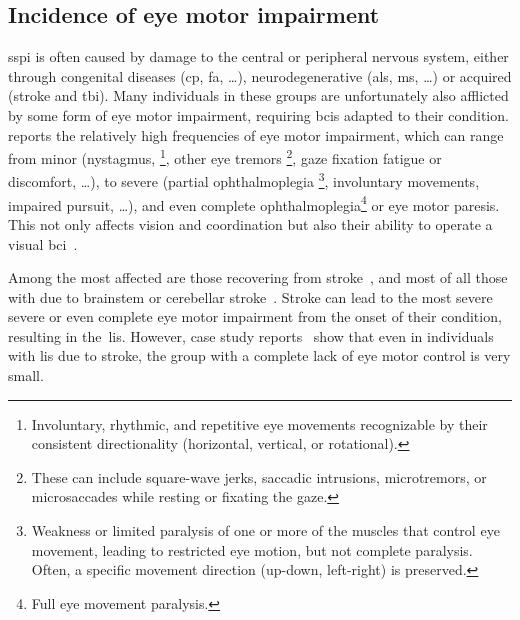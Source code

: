 \subsection{Incidence of eye motor impairment}
\label{sec:gaze-independent/gaze-dependence/incidence}
\Ac{sspi} is often caused by damage to the central or peripheral nervous
system, either through congenital diseases (\ac{cp}, \ac{fa}, \ldots),
neurodegenerative (\ac{als}, \ac{ms}, \ldots) or acquired (stroke and
\ac{tbi}).
Many individuals in these groups are unfortunately also afflicted by some form
of eye motor impairment, requiring \acp{bci} adapted to their condition.
 reports the relatively high frequencies of
eye motor impairment, which can range from minor (nystagmus,
\footnote{Involuntary, rhythmic, and repetitive eye movements recognizable by their
consistent directionality (horizontal, vertical, or rotational).},
other eye tremors
\footnote{These can include square-wave jerks, saccadic intrusions, microtremors, or
microsaccades while resting or fixating the gaze.},
gaze fixation fatigue or discomfort, \ldots), to severe (partial ophthalmoplegia
\footnote{Weakness or limited paralysis of one or more of the muscles that control eye
movement, leading to restricted eye motion, but not complete paralysis.
Often, a specific movement direction (up-down, left-right) is preserved.},
involuntary movements, impaired pursuit, \ldots), and even complete
ophthalmoplegia\footnote{Full eye movement paralysis.} or eye motor paresis.
This not only affects vision and coordination but also
their ability to operate a visual \ac{bci}~\cite{FriedOken2020}.

\begin{table}
  \centering
  \makebox[\textwidth][c]{%
  
  }
  \caption[Incidence of eye motor impairment in selected \acs{bci} user target
    populations.]{%
      Incidence of eye motor impairment in selected \ac{bci} user target
      populations. \acs{als}: \acl{als}, \acs{ms}: \acl{ms}, \acs{dmd}:
      \acl{dmd}, \acs{sma}: \acl{sma}, \acs{cp}: \acl{cp}, \acs{lis}: \acl{lis}.
      $+$: frequent, $-$: infrequent.
    }
    \label{tab:incidence}
\end{table}

Among the most affected are those recovering from stroke~\cite{Pollock2011,Rowe2019},
and most of all those with due to brainstem or cerebellar stroke~\cite{Moncayo2009,Bogousslavsky1987}.
Stroke can lead to the most severe severe or even complete eye motor impairment
from the onset of their condition, resulting in the~\ac{lis}.
However, case study reports~\cite{Patterson1986,Graber2016} show that even in individuals
with \ac{lis} due to stroke, the group with a complete lack of eye motor
control is very small.

